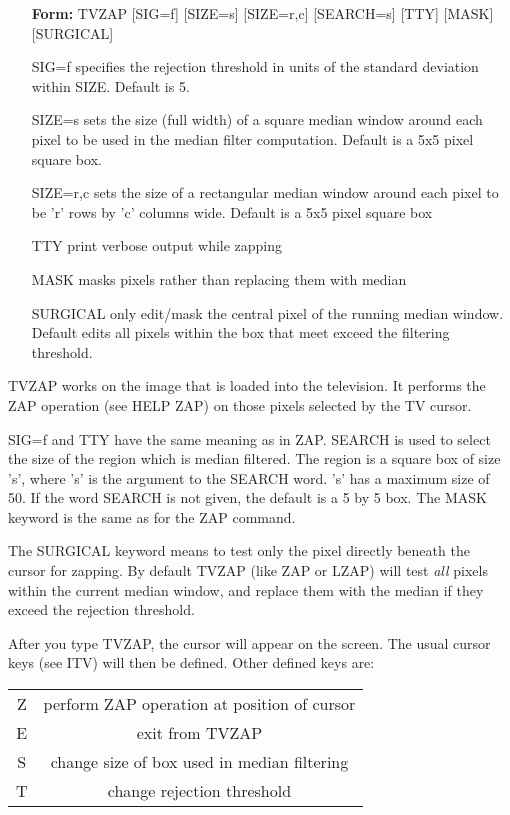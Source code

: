 \begin{itemize}
  \item[\textbf{Form: }TVZAP {[SIG=f]} {[SIZE=s]} {[SIZE=r,c]} 
       {[SEARCH=s]} {[TTY]} {[MASK]} {[SURGICAL]}\hfill]{}
  \item[SIG=f]{specifies the rejection threshold in units
       of the standard deviation within SIZE.  Default is 5}.
  \item[SIZE=s]{sets the size (full width) of a square median
       window around each pixel to be used in the median filter
       computation.  Default is a 5x5 pixel square box.}
  \item[SIZE=r,c]{sets the size of a rectangular median window
       around each pixel to be 'r' rows by 'c' columns wide.  Default
       is a 5x5 pixel square box}
  \item[TTY]{print verbose output while zapping}
  \item[MASK]{masks pixels rather than replacing them with median}
  \item[SURGICAL]{only edit/mask the central pixel of the running
       median window.  Default edits all pixels within the box that
       meet exceed the filtering threshold.}
\end{itemize}

TVZAP works on the image that is loaded into the television.  It performs
the ZAP operation (see HELP ZAP) on those pixels selected by the TV cursor.

SIG=f and TTY have the same meaning as in ZAP.  SEARCH is used to select
the size of the region which is median filtered.  The region is a square
box of size 's', where 's' is the argument to the SEARCH word. 's' has a
maximum size of 50.  If the word SEARCH is not given, the default is a 5 by
5 box.  The MASK keyword is the same as for the ZAP command.

The SURGICAL keyword means to test only the pixel directly beneath the
cursor for zapping.  By default TVZAP (like ZAP or LZAP) will test 
\textit{all} pixels within the current median window, and replace them
with the median if they exceed the rejection threshold.

After you type TVZAP, the cursor will appear on the screen.  The usual
cursor keys (see ITV) will then be defined.  Other defined keys are:

\begin{tabular}{cc}
   Z&perform ZAP operation at position of cursor\\
   E&exit from TVZAP\\
   S&change size of box used in median filtering\\
   T&change rejection threshold\\
\end{tabular}

